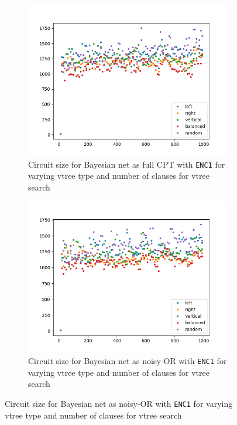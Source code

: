 \documentclass{article}
\begin{document}
\begin{figure}[h]
  \centering
  \begin{subfigure}[b]{0.4\linewidth}
    \includegraphics[width=\linewidth]{images/enc1_full.png}
    \caption{Circuit size for Bayesian net as full CPT with \texttt{ENC1} for varying vtree type and number of clauses for vtree search}
  \end{subfigure}
    \begin{subfigure}[b]{0.4\linewidth}
    \includegraphics[width=\linewidth]{images/enc1_noisy.png}
    \caption{Circuit size for Bayesian net as noisy-OR with \texttt{ENC1} for varying vtree type and number of clauses for vtree search}
  \end{subfigure}

\end{figure}
\end{document}
